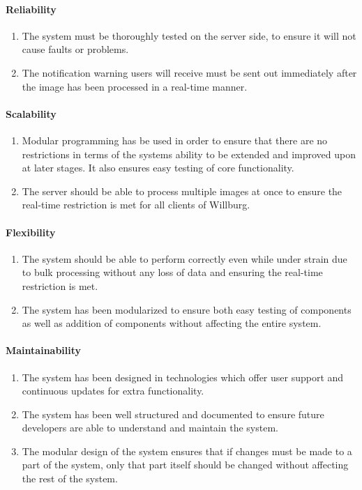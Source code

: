 \documentclass[a4paper,12pt]{report}
\begin{document}
\paragraph{Reliability}
\begin{enumerate}
	\item The system must be thoroughly tested on the server side, to ensure it will not cause faults or problems. 
	\item The notification warning users will receive must be sent out immediately after the image has been processed in a real-time manner.
\end{enumerate}
\paragraph{Scalability}
\begin{enumerate}
	\item Modular programming has be used in order to ensure that there are no restrictions in terms of the systems ability to be extended and improved upon at later stages. It also ensures easy testing of core functionality.
	\item The server should be able to process multiple images at once to ensure the real-time restriction is met for all clients of Willburg.
\end{enumerate}
\paragraph{Flexibility}
\begin{enumerate}
	\item The system should be able to perform correctly even while under strain due to bulk processing without any loss of data and ensuring the real-time restriction is met.
	\item The system has been modularized to ensure both easy testing of components as well as addition of components without affecting the entire system.
\end{enumerate}
\paragraph{Maintainability}
\begin{enumerate}
	\item The system has been designed in technologies which offer user support and continuous updates for extra functionality.
	\item The system has been well structured and documented to ensure future developers are able to understand and maintain the system.
	\item The modular design of the system ensures that if changes must be made to a part of the system, only that part itself should be changed without affecting the rest of the system.
\end{enumerate}
\end{document}
